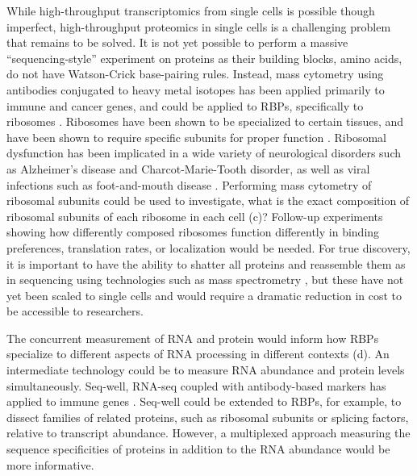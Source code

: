 While high-throughput transcriptomics from single cells is possible though imperfect, high-throughput proteomics in single cells is a challenging problem that remains to be solved. It is not yet possible to perform a massive ``sequencing-style'' experiment on proteins as their building blocks, amino acids, do not have Watson-Crick base-pairing rules. Instead, mass cytometry \cite{Chen2012-gb,Giesen2014-eb,Irish2006-qt,Spitzer2016-nt,Wu2012-dt} using antibodies conjugated to heavy metal isotopes has been applied primarily to immune and cancer genes, and could be applied to RBPs, specifically to ribosomes \cite{Wilson2012-zv}. Ribosomes have been shown to be specialized to certain tissues, and have been shown to require specific subunits for proper function \cite{Brombin2015-cw,Buszczak2014-yq,Shi2015-fh,Signer2014-zw,Gilbert2011-nr,Xue2012-fb}. Ribosomal dysfunction has been implicated in a wide variety of neurological disorders such as Alzheimer's disease and Charcot-Marie-Tooth disorder, as well as viral infections such as foot-and-mouth disease \cite{Ding2005-sr,Freed2010-dm}. Performing mass cytometry of ribosomal subunits could be used to investigate, what is the exact composition of ribosomal subunits of each ribosome in each cell (c)? Follow-up experiments showing how differently composed ribosomes function differently in binding preferences, translation rates, or localization would be needed. For true discovery, it is important to have the ability to shatter all proteins and reassemble them as in sequencing using technologies such as mass spectrometry \cite{Aebersold2003-yi,Wilhelm2014-tt}, but these have not yet been scaled to single cells and would require a dramatic reduction in cost to be accessible to researchers.

The concurrent measurement of RNA and protein would inform how RBPs specialize to different aspects of RNA processing in different contexts (d). An intermediate technology could be to measure RNA abundance and protein levels simultaneously. Seq-well, RNA-seq coupled with antibody-based markers has applied to immune genes \cite{Gierahn2017-ko}. Seq-well could be extended to RBPs, for example, to dissect families of related proteins, such as ribosomal subunits or splicing factors, relative to transcript abundance. However, a multiplexed approach measuring the sequence specificities of proteins in addition to the RNA abundance would be more informative.

